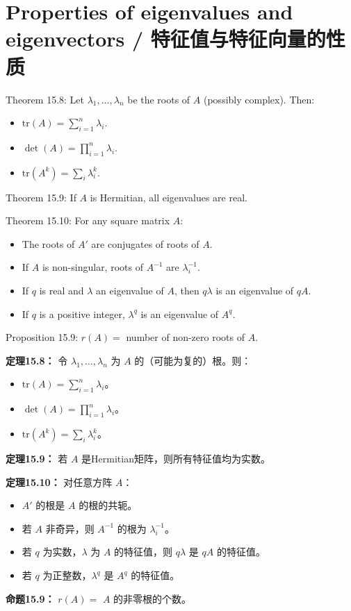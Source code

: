 \section{Properties of eigenvalues and eigenvectors / 特征值与特征向量的性质}

\begin{original}
Theorem 15.8: Let $\lambda_1, \dots, \lambda_n$ be the roots of $A$ (possibly complex). Then:
\begin{itemize}
\item $\text{tr}(A) = \sum_{i=1}^n \lambda_i$.
\item $\det(A) = \prod_{i=1}^n \lambda_i$.
\item $\text{tr}(A^k) = \sum_i \lambda_i^k$.
\end{itemize}

Theorem 15.9: If $A$ is Hermitian, all eigenvalues are real.

Theorem 15.10: For any square matrix $A$:
\begin{itemize}
\item[(i)] The roots of $A'$ are conjugates of roots of $A$.
\item[(ii)] If $A$ is non-singular, roots of $A^{-1}$ are $\lambda_i^{-1}$.
\item[(iii)] If $q$ is real and $\lambda$ an eigenvalue of $A$, then $q\lambda$ is an eigenvalue of $qA$.
\item[(iv)] If $q$ is a positive integer, $\lambda^q$ is an eigenvalue of $A^q$.
\end{itemize}

Proposition 15.9: $r(A) =$ number of non-zero roots of $A$.
\end{original}
\begin{translation}
\textbf{定理15.8：} 令 $\lambda_1, \dots, \lambda_n$ 为 $A$ 的（可能为复的）根。则：
\begin{itemize}
\item $\text{tr}(A) = \sum_{i=1}^n \lambda_i$。
\item $\det(A) = \prod_{i=1}^n \lambda_i$。
\item $\text{tr}(A^k) = \sum_i \lambda_i^k$。
\end{itemize}

\textbf{定理15.9：} 若 $A$ 是Hermitian矩阵，则所有特征值均为实数。

\textbf{定理15.10：} 对任意方阵 $A$：
\begin{itemize}
\item[(i)] $A'$ 的根是 $A$ 的根的共轭。
\item[(ii)] 若 $A$ 非奇异，则 $A^{-1}$ 的根为 $\lambda_i^{-1}$。
\item[(iii)] 若 $q$ 为实数，$\lambda$ 为 $A$ 的特征值，则 $q\lambda$ 是 $qA$ 的特征值。
\item[(iv)] 若 $q$ 为正整数，$\lambda^q$ 是 $A^q$ 的特征值。
\end{itemize}

\textbf{命题15.9：} $r(A) = $ $A$ 的非零根的个数。
\end{translation}

